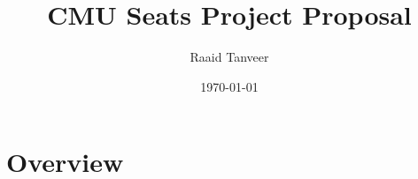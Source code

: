 \documentclass[11pt]{article}
\title{CMU Seats Project Proposal}
\author{Raaid Tanveer}
\date{\today}
\begin{document}
  \maketitle
  \section{Overview}
  
\end{document}
